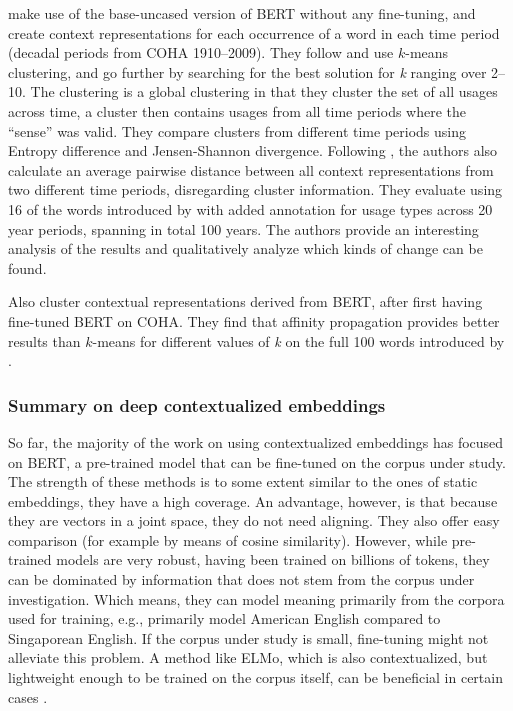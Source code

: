 \documentclass[output=paper]{langsci/langscibook}
\begin{document}
\citet{giulianelli-etal-2020-analysing} make use of the base-uncased version of BERT without any fine-tuning, and create context representations for each occurrence of a word in each time period (decadal periods from COHA 1910--2009). They follow \citet{schutze1998} and use $k$-means clustering, and go further by searching for the best solution for \textit{k} ranging over 2--10. The clustering is a global clustering in that they cluster the set of all usages across time, a cluster then contains usages from all time periods where the ``sense'' was valid. They compare clusters from different time periods using Entropy difference and Jensen-Shannon divergence. Following \citet{sagi-etal-2011}, the authors also calculate an average pairwise distance between all context representations from two different time periods, disregarding  cluster information. They evaluate using 16 of the words introduced by \citet{gulordava-baroni-2011-distributional} with added annotation for usage types across 20 year periods, spanning in total 100 years.
The authors provide an interesting analysis of the results and qualitatively analyze which kinds of change can be found. 

Also \citet{martincmzp20} cluster contextual representations derived from BERT, after first having fine-tuned BERT on COHA. They find that affinity propagation provides better results than $k$-means for different values of \textit{k} on the full 100 words introduced by \citet{gulordava-baroni-2011-distributional}.

\subsubsection{Summary on deep contextualized embeddings} So far, the majority of the work on using contextualized embeddings has focused on BERT, a pre-trained model that can be fine-tuned on the corpus under study. The strength of these methods is to some extent similar to the ones of static embeddings, they have a high coverage. An advantage, however, is that because they are vectors in a joint space, they do not need aligning. They also offer easy comparison (for example by means of cosine similarity). However, while pre-trained models are very robust, having been trained on billions of tokens, they can be dominated by information that does not stem from the corpus under investigation. Which means, they can model meaning primarily from the corpora used for training, e.g., primarily model American English compared to Singaporean English. If the corpus under study is small, fine-tuning might not alleviate this problem. A method like ELMo, which is also contextualized, but lightweight enough to be trained on the corpus itself, can be beneficial in certain cases \citep{kutuzov2020-phd}.
\end{document}
